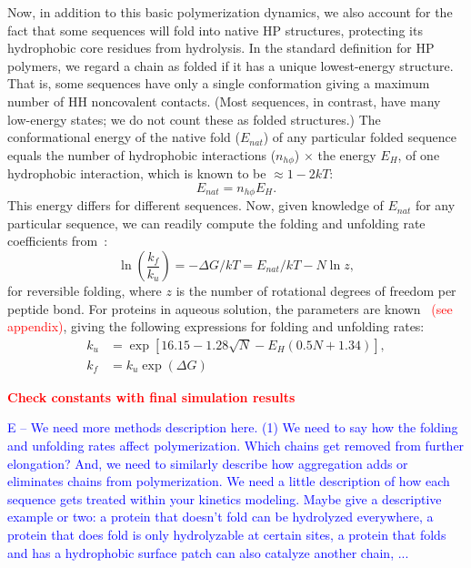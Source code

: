 \documentclass[journal=jacsat,manuscript=article,layout=twocolumn]{achemso}
\newcommand*{\gD}{\Delta}
\newcommand*{\pt}[1]{\left( #1\right)}
\newcommand*{\red}[1]{\textcolor{red}{#1}}
\newcommand*{\blue}[1]{\textcolor{blue}{#1}}
\begin{document}
 Now, in addition to this basic polymerization dynamics, we also account 
 for the fact that some sequences will fold into native HP structures, protecting its hydrophobic 
core residues from hydrolysis.  In the standard definition for HP polymers, we regard a chain as 
folded if it has a unique lowest-energy structure.  That is, some sequences have only a single 
conformation giving a maximum number of HH noncovalent contacts.  (Most sequences, in contrast, have 
many low-energy states; we do not count these as folded structures.)  The conformational energy of 
the native fold ($E_{nat}$) of any particular folded sequence equals the number of hydrophobic 
interactions ($n_{h\phi}$) $\times$ the energy $E_H$, of one hydrophobic interaction, which is known 
to be $\approx 1-2kT$\cite{Ghosh2009}:
\begin{equation}
 E_{nat}=n_{h\phi}E_H.
\end{equation} 
This energy differs for different sequences.  Now, given knowledge of $E_{nat}$ for any particular 
sequence, we can readily compute the folding and unfolding rate coefficients from~\cite{Ghosh2009}:
\begin{equation}
 \ln\pt{\frac{k_f}{k_u}}=-\gD G/kT = E_{nat}/kT-N\ln z,
\end{equation} 
for reversible folding, where $z$ is the number of rotational degrees of freedom per peptide bond.  
For proteins in aqueous solution, the parameters are known~\cite{Ghosh2010,Dill2011} \red{(see 
appendix)}, 
giving the following expressions for folding and unfolding rates:
\begin{equation}
\begin{split}
  k_u &= \exp[16.15-1.28 \sqrt{N} -E_H(0.5 N + 1.34)],\\
  k_f &= k_u\exp(\gD G)
\end{split}
\end{equation}

\red{\textbf{Check constants with final simulation results}}

\blue{E -- We need more methods description here.  (1) We need to say how the folding and 
unfolding rates affect polymerization.  Which chains get removed from further elongation?  And, we 
need to similarly describe how aggregation adds or eliminates chains from polymerization.  We need a 
little description of how each sequence gets treated within your kinetics modeling.  Maybe give a 
descriptive example or two: a protein that doesn't fold can be hydrolyzed everywhere, a protein that 
does fold is only hydrolyzable at certain sites, a protein that folds and has a hydrophobic surface 
patch can also catalyze another chain, ...}
\end{document}

